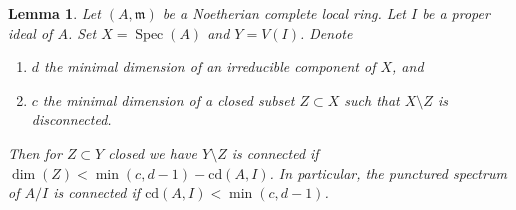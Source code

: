 \documentclass{stacks-project}
\newenvironment{reference}{\comment}{\endcomment}
\theoremstyle{plain}
\newtheorem{lemma}[subsection]{Lemma}
\theoremstyle{definition}
\theoremstyle{remark}
\numberwithin{equation}{subsection}
\def\Spec{\mathop{\mathrm{Spec}}}
\begin{document}
\begin{lemma}
\label{lemma-punctured-still-connected}
\begin{reference}
\cite[Theorem 1.6]{Varbaro}
\end{reference}
Let $(A, \mathfrak m)$ be a Noetherian complete local ring.
Let $I$ be a proper ideal of $A$.
Set $X = \Spec(A)$ and $Y = V(I)$.
Denote
\begin{enumerate}
\item $d$ the minimal dimension of an irreducible component of $X$, and
\item $c$ the minimal dimension of a closed subset $Z \subset X$
such that $X \setminus Z$ is disconnected.
\end{enumerate}
Then for $Z \subset Y$ closed we have $Y \setminus Z$ is connected if
$\dim(Z) < \min(c, d - 1) - \text{cd}(A, I)$. In particular, the punctured
spectrum of $A/I$ is connected if $\text{cd}(A, I) < \min(c, d - 1)$.
\end{lemma}
\end{document}
